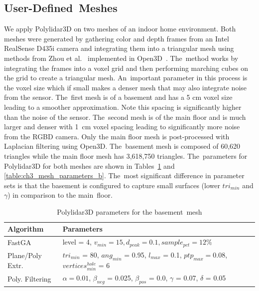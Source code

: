 \subsection{User-Defined~Meshes}\label{sec:ch3_results_meshes_parallel}

We apply Polylidar3D on two meshes of an indoor home environment.  Both meshes were generated by gathering color and depth frames from an Intel RealSense D435i camera and integrating them into a triangular mesh using methods from Zhou et al.~\cite{zhou_dense_2013}  implemented in Open3D~\cite{zhou_open3d_2018}. The~method works by integrating the frames into a voxel grid and then performing marching cubes on the grid to create a triangular mesh. An~important parameter in this process is the voxel size which if small makes a denser mesh that may also integrate noise from the sensor. The~first mesh is of a basement and has a 5 cm voxel size leading to a smoother approximation. Note this spacing is significantly higher than the noise of the sensor. The~second mesh is of the main floor and is much larger and denser with 1~cm voxel spacing leading to significantly more noise from the \ac{RGBD} camera. Only the main floor mesh is post-processed with Laplacian filtering using Open3D. The~basement mesh is composed of 60,620 triangles while the main floor mesh has 3,618,750 triangles. The~parameters for Polylidar3D for both meshes are shown in Tables~\ref{table:ch3_mesh_parameters_a} and \ref{table:ch3_mesh_parameters_b}. The~most significant difference in parameter sets is that the basement is configured to capture small surfaces (lower $tri_{min}$ and $\gamma$) in comparison to the main~floor.

\begin{table}[H]
\centering
\caption{Polylidar3D parameters for the basement~mesh}\label{table:ch3_mesh_parameters_a}
\begin{tabular}{@{}ll@{}}
\toprule
\textbf{Algorithm}        & \textbf{Parameters}                                                          \\ \midrule
FastGA           & level = 4,  $v_{min} = 15, d_{peak} = 0.1, sample_{pct} = 12\%$            \\
Plane/Poly Extr.      & $tri_{min}$ = 80, $ang_{min}$ = 0.95, $l_{max}$ = 0.1, $ptp_{max} = 0.08$, $vertices^{hole}_{min}$ = 6     \\
Poly. Filtering      & $\alpha = 0.01$, $\beta_{neg}$ = 0.025, $\beta_{pos}$ = 0.0, $\gamma$ = 0.07, $\delta$ = 0.05     \\ \bottomrule
\end{tabular}
\end{table}
\unskip

